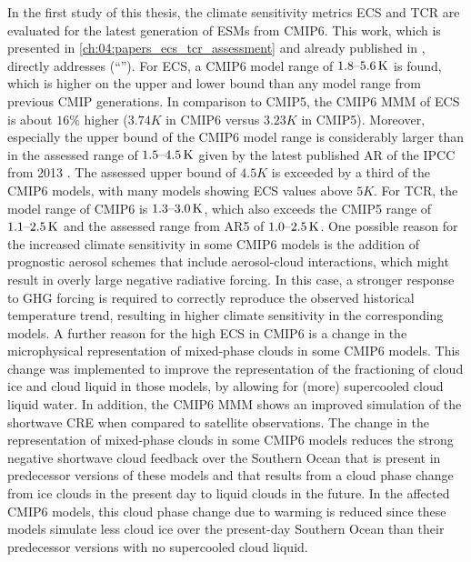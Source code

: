 In the first study of this thesis, the climate sensitivity metrics \ac{ECS} and
\ac{TCR} are evaluated for the latest generation of \acp{ESM} from \acs{CMIP}6.
This work, which is presented in \cref{ch:04:papers_ecs_tcr_assessment} and
already published in \textcite{Bock2020, Meehl2020}, directly addresses
 (\enquote{\KeyScienceQuestionOne{}}). For \ac{ECS}, a
\acs{CMIP}6 model range of $\rangeunit{1.8}{5.6}{K}$ is found, which is higher
on the upper and lower bound than any model range from previous \ac{CMIP}
generations. In comparison to \acs{CMIP}5, the \acs{CMIP}6 \ac{MMM} of \ac{ECS}
is about $16 \unit{\%}$ higher ($3.74 \unit{K}$ in \acs{CMIP}6 versus $3.23
\unit{K}$ in \acs{CMIP}5). Moreover, especially the upper bound of the
\acs{CMIP}6 model range is considerably larger than in the assessed range of
$\rangeunit{1.5}{4.5}{K}$ given by the latest published \ac{AR} of the
\ac{IPCC} from 2013 \autocite{Stocker2013}. The assessed upper bound of $4.5
\unit{K}$ is exceeded by a third of the \acs{CMIP}6 models, with many models
showing \ac{ECS} values above $5 \unit{K}$. For \ac{TCR}, the model range of
\acs{CMIP}6 is $\rangeunit{1.3}{3.0}{K}$, which also exceeds the \acs{CMIP}5
range of $\rangeunit{1.1}{2.5}{K}$ and the assessed range from \acs{AR}5 of
$\rangeunit{1.0}{2.5}{K}$. One possible reason for the increased climate
sensitivity in some \acs{CMIP}6 models is the addition of prognostic aerosol
schemes that include aerosol-cloud interactions, which might result in overly
large negative radiative forcing. In this case, a stronger response to \ac{GHG}
forcing is required to correctly reproduce the observed historical temperature
trend, resulting in higher climate sensitivity in the corresponding models. A
further reason for the high \ac{ECS} in \acs{CMIP}6 is a change in the
microphysical representation of mixed-phase clouds in some \acs{CMIP}6 models.
This change was implemented to improve the representation of the fractioning of
cloud ice and cloud liquid in those models, \eg{} by allowing for (more)
supercooled cloud liquid water. In addition, the \acs{CMIP}6 \ac{MMM} shows an
improved simulation of the shortwave \ac{CRE} when compared to satellite
observations. The change in the representation of mixed-phase clouds in some
\acs{CMIP}6 models reduces the strong negative shortwave cloud feedback over
the Southern Ocean that is present in predecessor versions of these models and
that results from a cloud phase change from ice clouds in the present day to
liquid clouds in the future. In the affected \acs{CMIP}6 models, this cloud
phase change due to warming is reduced since these models simulate less cloud
ice over the present-day Southern Ocean than their predecessor versions with no
supercooled cloud liquid.

